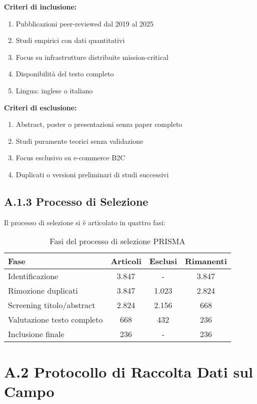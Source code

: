 \textbf{Criteri di inclusione:}
\begin{enumerate}
    \item Pubblicazioni peer-reviewed dal 2019 al 2025
    \item Studi empirici con dati quantitativi
    \item Focus su infrastrutture distribuite mission-critical
    \item Disponibilità del testo completo
    \item Lingua: inglese o italiano
\end{enumerate}

\textbf{Criteri di esclusione:}
\begin{enumerate}
    \item Abstract, poster o presentazioni senza paper completo
    \item Studi puramente teorici senza validazione
    \item Focus esclusivo su e-commerce B2C
    \item Duplicati o versioni preliminari di studi successivi
\end{enumerate}

\subsection{\texorpdfstring{\textbf{A.1.3 Processo di Selezione}}{A.1.3 - Processo di Selezione}}

Il processo di selezione si è articolato in quattro fasi:

\begin{table}[htbp]
\centering
\caption{Fasi del processo di selezione PRISMA}
\begin{tabular}{|l|c|c|c|}
\hline
\textbf{Fase} & \textbf{Articoli} & \textbf{Esclusi} & \textbf{Rimanenti} \\
\hline
Identificazione & 3.847 & - & 3.847 \\
Rimozione duplicati & 3.847 & 1.023 & 2.824 \\
Screening titolo/abstract & 2.824 & 2.156 & 668 \\
Valutazione testo completo & 668 & 432 & 236 \\
Inclusione finale & 236 & - & 236 \\
\hline
\end{tabular}
\end{table}

\section{\texorpdfstring{\textbf{A.2 Protocollo di Raccolta Dati sul Campo}}{A.2 - Protocollo di Raccolta Dati sul Campo}}

